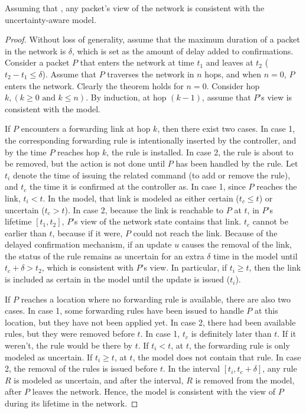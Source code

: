  \vspace{-0.1in}
\begin{theorem} Assuming that ,
any packet's view of the network is consistent with the uncertainty-aware model.
\end{theorem}
  \vspace{-0.1in}
  \vspace{-0.1in}
\begin{proof} Without loss of generality, assume that the maximum duration of a
packet in the network is $\delta$, which is set as the amount of delay added to
confirmations.  Consider a packet $P$ that enters the network at time $t_1$ and
leaves at $t_2$ ($t_2-t_1 \le \delta$).  Assume that $P$ traverses the network in
$n$ hops, and when $n=0$, $P$ enters the network.  Clearly the theorem holds for
$n=0$.  Consider hop $k, (k \ge 0\mbox{ and } k \le n)$.  By induction, at
hop $(k-1)$, assume that $P$'s view is consistent with the model.

If $P$ encounters a forwarding link at hop $k$, then there exist two cases.
In case 1, the corresponding forwarding rule is intentionally inserted by the
controller, and by the time $P$ reaches hop $k$, the rule is installed.  In case
2, the rule is about to be removed, but the action is not done until $P$ has been
handled by the rule.  Let $t_i$ denote the time of issuing the related command (to add or
remove the rule), and $t_c$ the time it is confirmed at the controller as.  
In case 1, since $P$ reaches the link, $t_i < t$.  In the model, that
link is modeled as either certain ($t_c \le t$) or uncertain ($t_c > t$).  In
case 2, because the link is reachable to $P$ at $t$, in $P$'s lifetime $[t_1,
t_2]$, $P$'s view of the network state contains that link.  $t_c$ cannot be
earlier than $t$, because if it were, $P$ could not reach the link.  Because of the delayed
confirmation mechanism, if an update $u$ causes the removal of the link, the
status of the rule remains as uncertain for an extra $\delta$ time in the model
until $t_c + \delta > t_2$, which is consistent with $P$'s view.  
In particular, if $t_i \ge t$, then the link is included as certain in the model
until the update is issued ($t_i$).

If $P$ reaches a location where no forwarding rule is available, there are also
two cases.  In case 1, some forwarding rules have been issued to handle $P$ at this
location, but they have not been applied yet. In case 2, there had been available rules, but
they were removed before $t$.  In case 1, $t_c$ is definitely later than $t$.
If it weren't, the rule would be there by $t$.  If $t_i < t$, at $t$, the forwarding rule
is only modeled as uncertain.  If $t_i \ge t$, at $t$, the model does not
contain that rule.  In case 2, the removal of the rules is issued before $t$.
In the interval $[t_i, t_c + \delta]$, any rule $R$ is modeled as uncertain,
and after the interval, $R$ is removed from the model, after $P$ leaves the
network.  Hence, the model is consistent with the view of $P$ during its
lifetime in the network.
\end{proof}
